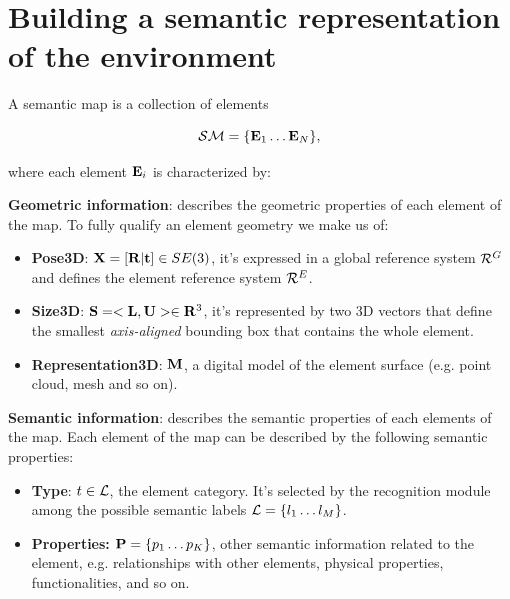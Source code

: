 \documentclass{article}
\begin{document}
	\section{Building a semantic representation of the environment}
	

	A semantic map is a collection of elements
	
	\begin{equation}
	\mathcal{SM} = \{ \mathbf{E}_1 \dots \mathbf{E}_N \},
	\end{equation}
	
	\noindent
	where each element $\mathbf{E}_i$ is characterized by:
	
	\begin{description}
		\item {\bf Geometric information}: describes the geometric properties of each element of the map. To fully qualify an element geometry we make us of:
		\begin{itemize}
			\item {\bf Pose3D}: $\mathbf{X} = [ \mathbf{R} | \mathbf{t}] \in SE(3)$, it's expressed in a global reference system $\mathcal{R}^G$ and defines the element reference system $\mathcal{R}^E$.
			\item {\bf Size3D}: $\mathbf{S} = <\mathbf{L} ,\mathbf{U}> \in \mathbf{R}^3 $, it's represented by two 3D vectors that define the smallest \emph{axis-aligned} bounding box that contains the whole element.
			\item {\bf Representation3D}: $\mathbf{M}$, a digital model of the element surface (e.g. point cloud, mesh and so on).
		\end{itemize}
		\item {\bf Semantic information}: describes the semantic properties of each elements of the map. Each element of the map can be described by the following semantic properties:
		\begin{itemize}
			\item {\bf Type}: $t \in \mathcal{L}$, the element category. It's selected by the recognition module among the possible semantic labels $\mathcal{L} = \{l_1 \dots l_M \}$.
			\item {\bf Properties:} $\mathbf{P} = \{ p_1 \dots p_K \}$, other semantic information related to the element, e.g. relationships with other elements, physical properties, functionalities, and so on. 
		\end{itemize}   
	\end{description}
\end{document}
